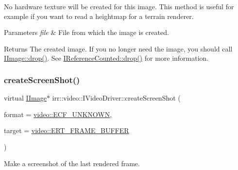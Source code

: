 No hardware texture will be created for this image. This method is useful for example if you want to read a heightmap for a terrain renderer. 
\begin{DoxyParams}{Parameters}
{\em file} & File from which the image is created. \\
\hline
\end{DoxyParams}
\begin{DoxyReturn}{Returns}
The created image. If you no longer need the image, you should call \hyperlink{classirr_1_1IReferenceCounted_a03856a09355b89d178090c4a5f738543}{I\+Image\+::drop()}. See \hyperlink{classirr_1_1IReferenceCounted_a03856a09355b89d178090c4a5f738543}{I\+Reference\+Counted\+::drop()} for more information. 
\end{DoxyReturn}
\mbox{\label{classirr_1_1video_1_1IVideoDriver_a50db0e36d406089167facf70b2eb4706}} 
\subsubsection{\texorpdfstring{create\+Screen\+Shot()}{createScreenShot()}}
{\footnotesize\ttfamily virtual \hyperlink{classirr_1_1video_1_1IImage}{I\+Image}$\ast$ irr\+::video\+::\+I\+Video\+Driver\+::create\+Screen\+Shot (\begin{DoxyParamCaption}\item[{\hyperlink{namespaceirr_1_1video_a1d5e487888c32b1674a8f75116d829ed}{video\+::\+E\+C\+O\+L\+O\+R\+\_\+\+F\+O\+R\+M\+AT}}]{format = {\ttfamily \hyperlink{namespaceirr_1_1video_a1d5e487888c32b1674a8f75116d829eda209608685f06c86c6ae489896a246e77}{video\+::\+E\+C\+F\+\_\+\+U\+N\+K\+N\+O\+WN}},  }\item[{\hyperlink{namespaceirr_1_1video_a5b61a3f2bd5d458f76f2eb20b0f40972}{video\+::\+E\+\_\+\+R\+E\+N\+D\+E\+R\+\_\+\+T\+A\+R\+G\+ET}}]{target = {\ttfamily \hyperlink{namespaceirr_1_1video_a5b61a3f2bd5d458f76f2eb20b0f40972a5745c3dbb79f4796906d8b15c42496b0}{video\+::\+E\+R\+T\+\_\+\+F\+R\+A\+M\+E\+\_\+\+B\+U\+F\+F\+ER}} }\end{DoxyParamCaption})\hspace{0.3cm}{\ttfamily [pure virtual]}}



Make a screenshot of the last rendered frame. 

